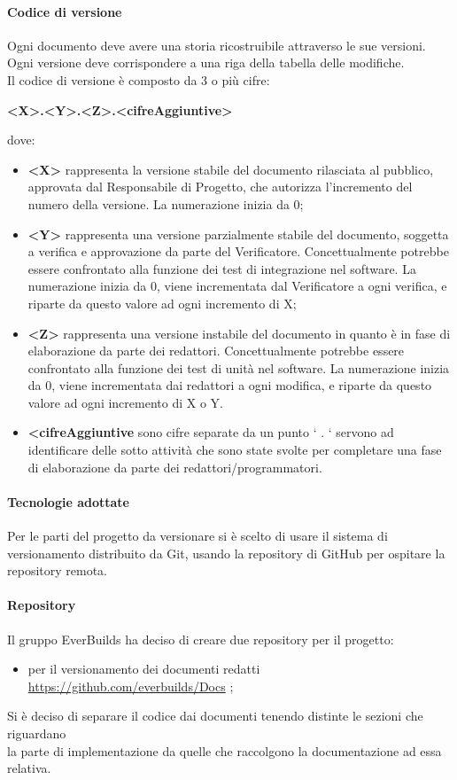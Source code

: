 			\paragraph{Codice di versione}
				Ogni documento deve avere una storia ricostruibile attraverso le sue versioni.  \\
				Ogni versione deve corrispondere a una riga della tabella delle modifiche. \\
				Il codice di versione è composto da 3 o più cifre: \\
				\begin{center}
					\textbf{<X>.<Y>.<Z>.<cifreAggiuntive>}
				\end{center}
				dove:
				\begin{itemize}
					\item\textbf{<X>} rappresenta la versione stabile del documento rilasciata al pubblico, approvata dal Responsabile di Progetto, che autorizza l’incremento del numero della versione. La numerazione inizia da 0;
					\item\textbf{<Y>} rappresenta una versione parzialmente stabile del documento, soggetta a verifica e approvazione da parte del Verificatore. Concettualmente potrebbe essere confrontato alla funzione dei test di integrazione nel software. La numerazione inizia da 0, viene incrementata dal Verificatore a ogni verifica, e riparte da questo valore ad ogni incremento di X;
					\item\textbf{<Z>} rappresenta una versione instabile del documento in quanto è in fase di elaborazione da parte dei redattori. Concettualmente potrebbe essere confrontato alla funzione dei test di unità nel software. La numerazione inizia da 0, viene incrementata dai redattori a ogni modifica, e riparte da questo valore ad ogni incremento di X o Y.
					\item\textbf{<cifreAggiuntive} sono cifre separate da un punto ‘ . ‘ servono ad identificare delle sotto attività che sono state svolte per completare una fase di elaborazione da parte dei redattori/programmatori.
				\end{itemize}
			\paragraph{Tecnologie adottate}
				Per le parti del progetto da versionare si è scelto di usare il sistema di versionamento distribuito da Git, usando la repository di GitHub per ospitare la repository remota.
			\paragraph{Repository}
				Il gruppo EverBuilds ha deciso di creare due repository per il progetto:
				\begin{itemize}
					\item per il versionamento dei documenti redatti \url{https://github.com/everbuilds/Docs} ;
				\end{itemize}
				Si è deciso di separare il codice dai documenti tenendo distinte le sezioni che riguardano \\
				la parte di implementazione da quelle che raccolgono la documentazione ad essa relativa.\\
